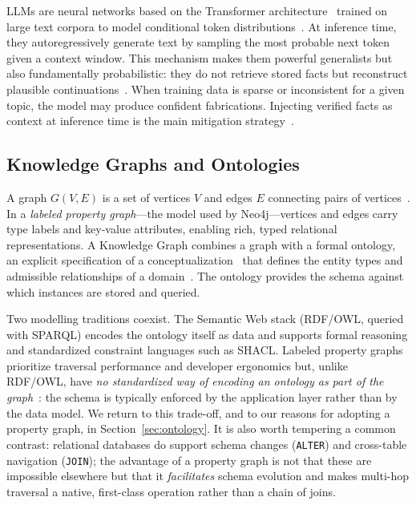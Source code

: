 \documentclass{ceurart}
\begin{document}
LLMs are neural networks based on the Transformer
architecture~\cite{vaswani2017attention} trained on large text corpora to model
conditional token distributions~\cite{brown2020language}. At inference time,
they autoregressively generate text by sampling the most probable next token given
a context window. This mechanism makes them powerful generalists but also
fundamentally probabilistic: they do not retrieve stored facts but reconstruct
plausible continuations~\cite{mallen2023trustlanguagemodelsinvestigating}.
When training data is sparse or inconsistent for a given topic, the model may
produce confident fabrications. Injecting verified facts as context at inference
time is the main mitigation
strategy~\cite{gao2024retrievalaugmentedgenerationlargelanguage,
agrawal2024knowledgegraphsreducehallucinations}.

\subsection{Knowledge Graphs and Ontologies}
\label{sec:kg}

A graph $G(V,E)$ is a set of vertices $V$ and edges $E$ connecting pairs of
vertices~\cite{diestel2017graph}. In a \emph{labeled property graph}---the model
used by Neo4j---vertices and edges carry type labels and key-value attributes,
enabling rich, typed relational representations. A Knowledge Graph combines a
graph with a formal ontology, an explicit specification of a
conceptualization~\cite{GRUBER1993199} that defines the entity types and
admissible relationships of a domain~\cite{hogan2021knowledge}. The ontology
provides the schema against which instances are stored and queried.

Two modelling traditions coexist. The Semantic Web stack (RDF/OWL, queried with
SPARQL) encodes the ontology itself as data and supports formal reasoning and
standardized constraint languages such as SHACL. Labeled property graphs
prioritize traversal performance and developer ergonomics but, unlike RDF/OWL,
have \emph{no standardized way of encoding an ontology as part of the
graph}~\cite{hogan2021knowledge}: the schema is typically enforced by the
application layer rather than by the data model. We return to this trade-off, and
to our reasons for adopting a property graph, in Section~\ref{sec:ontology}.
It is also worth tempering a common contrast: relational databases do support
schema changes (\texttt{ALTER}) and cross-table navigation (\texttt{JOIN}); the
advantage of a property graph is not that these are impossible elsewhere but that
it \emph{facilitates} schema evolution and makes multi-hop traversal a native,
first-class operation rather than a chain of joins.
\end{document}
